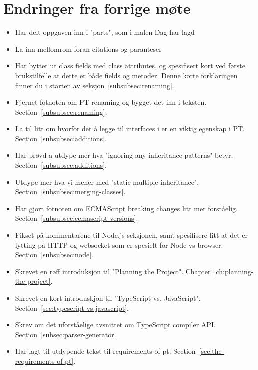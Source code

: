
\chapter*{Endringer fra forrige møte}

\begin{itemize}
    \item Har delt oppgaven inn i "parts", som i malen Dag har lagd
    \item La inn mellomrom foran citations og paranteser
    \item Har byttet ut class fields med class attributes, og spesifisert kort ved første brukstilfelle at dette er både fields og metoder.
    Denne korte forklaringen finner du i starten av seksjon~\vref{subsubsec:renaming}.
    \item Fjernet fotnoten om PT renaming og bygget det inn i teksten.
    Section~\vref{subsubsec:renaming}.
    \item La til litt om hvorfor det å legge til interfaces i  er en viktig egenskap i PT.
    Section~\vref{subsubsec:additions}.
    \item Har prøvd å utdype mer hva "ignoring any inheritance-patterns" betyr.
    Section~\vref{subsubsec:additions}.
    \item Utdype mer hva vi mener med "static multiple inheritance".
    Section~\vref{subsubsec:merging-classes}.
    \item Har gjort fotnoten om ECMAScript breaking changes litt mer forståelig.
    Section~\vref{subsubsec:ecmascript-versions}.
    \item Fikset på kommentarene til Node.js seksjonen, samt spesifisere litt at det er lytting på HTTP og websocket som er spesielt for Node vs browser.
    Section~\vref{subsubsec:node}.
    \item Skrevet en røff introduksjon til "Planning the Project".
    Chapter~\vref{ch:planning-the-project}.
    \item Skrevet en kort introduskjon til "TypeScript vs. JavaScript".
    Section~\vref{sec:typescript-vs-javascript}.
    \item Skrev om det uforståelige avsnittet om TypeScript compiler API.
    Section~\vref{subsec:parser-generator}.
    \item Har lagt til utdypende tekst til requirements of pt.
    Section~\vref{sec:the-requirements-of-pt}.
\end{itemize}

